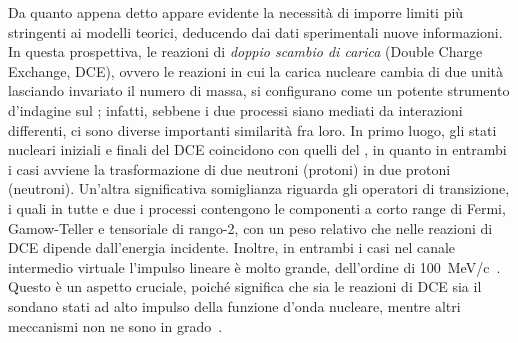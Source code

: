 Da quanto appena detto appare evidente la necessità di imporre limiti più stringenti ai modelli teorici, deducendo dai dati sperimentali nuove informazioni. 
In questa prospettiva, le reazioni di \emph{doppio scambio di carica} (Double Charge Exchange, DCE), ovvero le reazioni in cui la carica nucleare cambia di due unità lasciando invariato il numero di massa, si configurano come un potente strumento d'indagine sul \doppiobeta; 
infatti, sebbene i due processi siano mediati da interazioni differenti, ci sono diverse importanti similarità fra loro.
In primo luogo, gli stati nucleari iniziali e finali del DCE coincidono con quelli del \doppiobeta{}, in quanto in entrambi i casi avviene la trasformazione di due neutroni (protoni) in due protoni (neutroni). 
Un'altra significativa somiglianza riguarda gli operatori di transizione, i quali in tutte e due i processi contengono le componenti a corto range di Fermi, Gamow-Teller e tensoriale di rango-2, con un peso relativo che nelle reazioni di DCE dipende dall'energia incidente. 
Inoltre, in entrambi i casi nel canale intermedio virtuale l'impulso lineare è molto grande, dell'ordine di 100~MeV/c~\cite{barea:prl12}. Questo è un aspetto cruciale, poiché significa che sia le reazioni di DCE sia il \doppiobeta{} sondano stati ad alto impulso della funzione d'onda nucleare, mentre altri meccanismi non ne sono in grado~\cite{puppe:prc11}.

